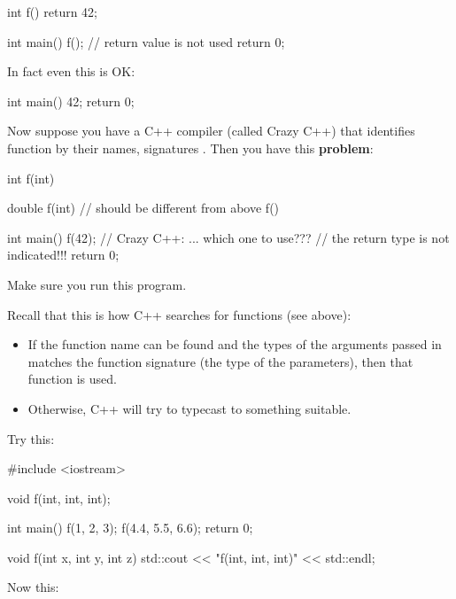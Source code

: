 \begin{consolethree}[escapeinside=||]
int f()
{
    return 42;
}

int main()
{
    f(); // return value is not used
    return 0;
}
\end{consolethree}

In fact even this is OK:

\begin{consolethree}[escapeinside=||]
int main()
{
    42;
    return 0;
}
\end{consolethree}

Now suppose you have a C++ compiler (called Crazy C++) that identifies function by their names, signatures . Then you have this \textbf{problem}:

\begin{consolethree}[escapeinside=||]
int f(int)
{}

double f(int) // should be different from above f()
{}

int main()
{
    f(42); // Crazy C++: ... which one to use???
           // the return type is not indicated!!!
    return 0;
}
\end{consolethree}

Make sure you run this program.


\newpage{}

Recall that this is how C++ searches for functions (see above):

\begin{itemize}
\item If the function name can be found and the types of the arguments
  passed in matches the function signature (the type of the parameters),
  then that function is used.
\item Otherwise, C++ will try to typecast to something suitable.
\end{itemize}

Try this:

\begin{consolethree}[escapeinside=||]
#include <iostream>

void f(int, int, int);

int main()
{
    f(1, 2, 3);
    f(4.4, 5.5, 6.6);
    return 0;
}

void f(int x, int y, int z)
{
    std::cout << "f(int, int, int)" << std::endl;
}
\end{consolethree}

Now this:

